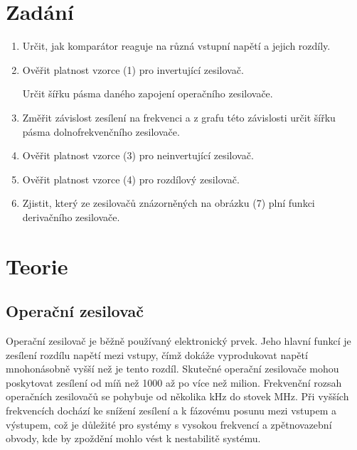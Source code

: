 \documentclass[a4paper,11pt]{article}
\begin{document}
\vskip10pt
    \begin{minipage}[t]{0.5\textwidth} 
        \section{Zadání}    
            \begin{enumerate}
                \item Určit, jak komparátor reaguje na různá vstupní napětí a jejich rozdíly. 
                \item Ověřit platnost vzorce (1) pro invertující zesilovač.
                \par Určit šířku pásma daného zapojení operačního zesilovače.
                \item Změřit závislost zesílení na frekvenci a z grafu této závislosti určit šířku pásma dolnofrekvenčního zesilovače.
                \item Ověřit platnost vzorce (3) pro neinvertující zesilovač.
                \item Ověřit platnost vzorce (4) pro rozdílový zesilovač.
                \item Zjistit, který ze zesilovačů znázorněných na obrázku (7) plní funkci derivačního zesilovače. 
            \end{enumerate}
        \section{Teorie}
            \subsection{Operační zesilovač}
                Operační zesilovač je běžně používaný elektronický prvek. Jeho hlavní funkcí je zesílení rozdílu napětí mezi vstupy, čímž dokáže vyprodukovat napětí mnohonásobně vyšší než je tento rozdíl. Skutečné operační zesilovače mohou poskytovat zesílení od míň než 1000 až po více než milion. Frekvenční rozsah operačních zesilovačů se pohybuje od několika kHz do stovek MHz. Při vyšších frekvencích dochází ke snížení zesílení a k fázovému posunu mezi vstupem a výstupem, což je důležité pro systémy s vysokou frekvencí a zpětnovazební obvody, kde by zpoždění mohlo vést k nestabilitě systému.
    \end{minipage}
    \hspace{10pt}
\end{document}
